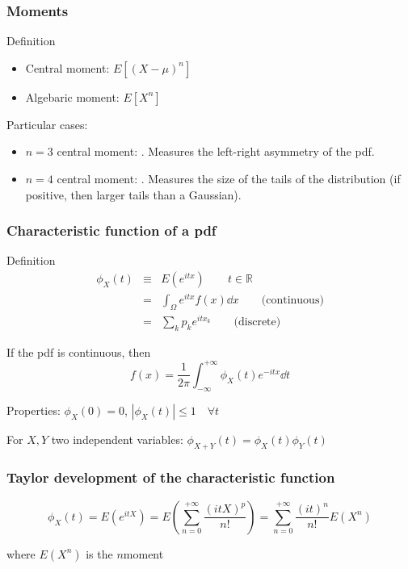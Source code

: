 \documentclass[9pt]{beamer}
\begin{document}
\begin{frame}
 \frametitle{Moments}
 
 \begin{block}{Definition}
  \begin{itemize}
   \item Central moment: $E\left[ (X-\mu)^n \right]$
   \item Algebaric moment: $E\left[ X^n \right]$
  \end{itemize}

 \end{block}

 Particular cases: 
 
 \begin{itemize}
  \item $n=3$ central moment: . Measures the left-right asymmetry of the pdf.
  \item $n=4$ central moment: . Measures the size of the tails of the distribution (if positive, then larger tails than a Gaussian).
 \end{itemize}

 
\end{frame}

\begin{frame}
 \frametitle{Characteristic function of a pdf}
 
 \begin{block}{Definition}
  \begin{eqnarray}
   \phi_X (t) & \equiv & E(e^{itx}) \qquad t \in \mathbb{R} \nonumber \\
   & = & \int_\Omega e^{itx} f(x) \dd x \qquad \text{(continuous)}\nonumber \\
   & = & \sum_k p_k e^{i t x_k}\qquad \text{(discrete)} \nonumber 
  \end{eqnarray}

 \end{block}
 
 If the pdf is continuous, then 
 $$f(x) = \frac{1}{2 \pi} \int_{-\infty}^{+\infty} \phi_X(t) e^{-itx} \dd t$$
 
 Properties: $\phi_X (0) = 0$, $|\phi_X(t)| \leq 1 \quad \forall t$
 
 For $X,Y$ two independent variables: $\phi_{X+Y}(t) = \phi_X(t) \phi_Y(t)$


\end{frame}

\begin{frame}
 \frametitle{Taylor development of the characteristic function}
 
 \begin{block}{}
  $$\phi_X(t) = E(e^{itX}) = E \left( \sum_{n=0}^{+\infty} \frac{(itX)^p}{n!} \right) = \sum_{n=0}^{+\infty} \frac{(it)^n}{n!} E(X^n) $$
  
  where $E(X^n)$ is the $n$\ith moment
 \end{block}
 

\end{frame}
\end{document}
